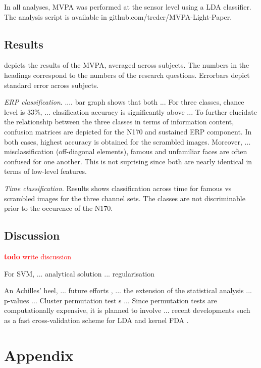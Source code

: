 \documentclass[utf8]{frontiersSCNS} %
\newcommand{\todo}[1]{\textcolor{red}{\textbf{todo} #1}}
\begin{document}
In all analyses, MVPA was performed at the sensor level using a LDA classifier. The analysis script is available in github.com/treder/MVPA-Light-Paper.

\subsection{Results}

 depicts the results of the MVPA, averaged across subjects. The numbers in the headings correspond to the numbers of the research questions. Errorbars depict standard error across subjects.

\textit{ERP classification}. .... bar graph shows that both ... For three classes, chance level is 33\%, ... clasification accuracy is significantly above ... To further elucidate the relationship between the three classes in terms of information content, confusion matrices are depicted for the N170 and sustained ERP component. In both cases, highest accuracy is obtained for the scrambled images. Moreover, ... misclassification (off-diagonal elements), famous and unfamiliar faces are often confused for one another. This is not suprising since both are nearly identical in terms of low-level features. 

\textit{Time classification}. Results shows classification across time for famous vs scrambled images for the three channel sets. The classes are not discriminable prior to the occurence of the N170. 


\subsection{Discussion}


\todo{write discussion}

For SVM, ... analytical solution ... regularisation \citep{Hastie2004TheMachine}


An Achilles' heel, ... future efforts , ... the extension of the statistical analysis ... p-values ... Cluster permutation test s ... Since permutation tests are computationally expensive, it is planned to involve ... recent developments such as a fast cross-validation scheme for LDA and kernel FDA \citep{Treder2019DirectFDA}.

\section{Appendix}
\end{document}
